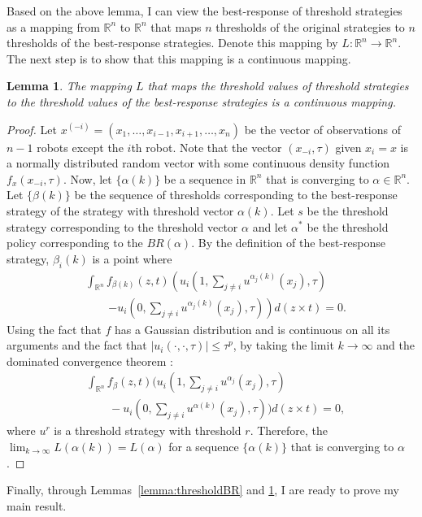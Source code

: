 \documentclass[defaultstyle,12pt]{proposal}
\newtheorem{lemma}{Lemma}
\def\R{\mathbb{R}}
\begin{document}
Based on the above lemma, I can view the best-response of threshold strategies as a mapping from $\R^n$ to $\R^n$ that maps $n$ thresholds of the original strategies to $n$ thresholds of the best-response strategies. Denote this mapping by $L:\R^n\to\R^n$. The next step is to show that this mapping is a continuous mapping. 
\begin{lemma}\label{lemma:continuous}
The mapping $L$ that maps the threshold values of threshold strategies to the threshold values of the best-response strategies is a continuous mapping. 
\end{lemma}
\begin{proof}
Let $x^{(-i)}=(x_1,\ldots,x_{i-1},x_{i+1},\ldots,x_n)$ be the vector of observations of $n-1$ robots except the $i$th robot. Note that the vector $(x_{-i},\tau)$ given $x_i=x$ is a normally distributed random vector with some continuous density function $f_{x}(x_{-i},\tau)$. Now, let $\{\alpha(k)\}$ be a sequence in $\R^n$ that is converging to $\alpha\in\R^n$. Let $\{\beta(k)\}$ be the sequence of thresholds corresponding to the best-response strategy of the strategy with threshold vector $\alpha(k)$. Let $s$ be the threshold strategy corresponding to the threshold vector $\alpha$ and let $\alpha^*$ be the threshold policy corresponding to the $BR(\alpha)$. By the definition of the best-response strategy, $\beta_i(k)$ is a point where 
\begin{align*}
&\int_{\R^{n}}f_{\beta(k)}(z,t)\left(u_i(1,\sum_{j\not=i}u^{\alpha_j(k)}(x_j),\tau)\right.\\
&\qquad\left.-u_i(0,\sum_{j\not=i}u^{\alpha_j(k)}(x_j),\tau)\right)d(z\times t)=0.
\end{align*}
Using the fact that $f$ has a Gaussian distribution and is continuous on all its arguments and the fact that $|u_i(\cdot,\cdot,\tau)|\leq \tau^p$, by taking the limit $k\to\infty$ and the dominated convergence theorem \cite{Folland2013}:
\begin{align*}
&\int_{\R^{n}}f_{\beta}(z,t)(u_i(1,\sum_{j\not=i}u^{\alpha_j}(x_j),\tau)\\ 
&\qquad-u_i(0,\sum_{j\not=i}u^{\alpha(k)}(x_j),\tau))d(z\times t)=0,
\end{align*}
where $u^{r}$ is a threshold strategy with threshold $r$. Therefore, the $\lim_{k\to\infty}L(\alpha(k))=L(\alpha)$ for a sequence $\{\alpha(k)\}$ that is converging to $\alpha$.
\end{proof}
Finally, through Lemmas~\ref{lemma:thresholdBR} and \ref{lemma:continuous}, I are ready to prove my main result. 
\end{document}
